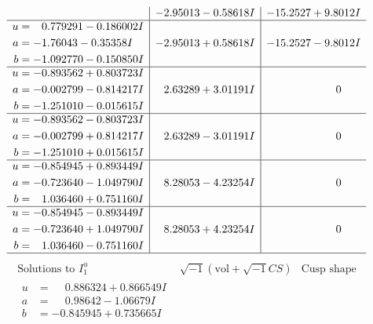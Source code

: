 \documentclass[1p]{elsarticle_modified}
\theoremstyle{definition}
\newcommand{\I}{\sqrt{-1}}
\begin{document}
$$\begin{array}{c|c|c}
 & -2.95013 - 0.58618 I & -15.2527 + 9.8012 I \\ \hline\begin{aligned}
u &= \phantom{-}0.779291 - 0.186002 I \\
a &= -1.76043 - 0.35358 I \\
b &= -1.092770 - 0.150850 I\end{aligned}
 & -2.95013 + 0.58618 I & -15.2527 - 9.8012 I \\ \hline\begin{aligned}
u &= -0.893562 + 0.803723 I \\
a &= -0.002799 - 0.814217 I \\
b &= -1.251010 - 0.015615 I\end{aligned}
 & \phantom{-}2.63289 + 3.01191 I & \phantom{-0.000000 } 0 \\ \hline\begin{aligned}
u &= -0.893562 - 0.803723 I \\
a &= -0.002799 + 0.814217 I \\
b &= -1.251010 + 0.015615 I\end{aligned}
 & \phantom{-}2.63289 - 3.01191 I & \phantom{-0.000000 } 0 \\ \hline\begin{aligned}
u &= -0.854945 + 0.893449 I \\
a &= -0.723640 - 1.049790 I \\
b &= \phantom{-}1.036460 + 0.751160 I\end{aligned}
 & \phantom{-}8.28053 - 4.23254 I & \phantom{-0.000000 } 0 \\ \hline\begin{aligned}
u &= -0.854945 - 0.893449 I \\
a &= -0.723640 + 1.049790 I \\
b &= \phantom{-}1.036460 - 0.751160 I\end{aligned}
 & \phantom{-}8.28053 + 4.23254 I & \phantom{-0.000000 } 0\\
 \hline 
 \end{array}$$\newpage$$\begin{array}{c|c|c}  
\text{Solutions to }I^u_{1}& \I (\text{vol} + \sqrt{-1}CS) & \text{Cusp shape}\\
 \hline 
\begin{aligned}
u &= \phantom{-}0.886324 + 0.866549 I \\
a &= \phantom{-}0.98642 - 1.06679 I \\
b &= -0.845945 + 0.735665 I\end{aligned}

\end{array}$$
\end{document}
